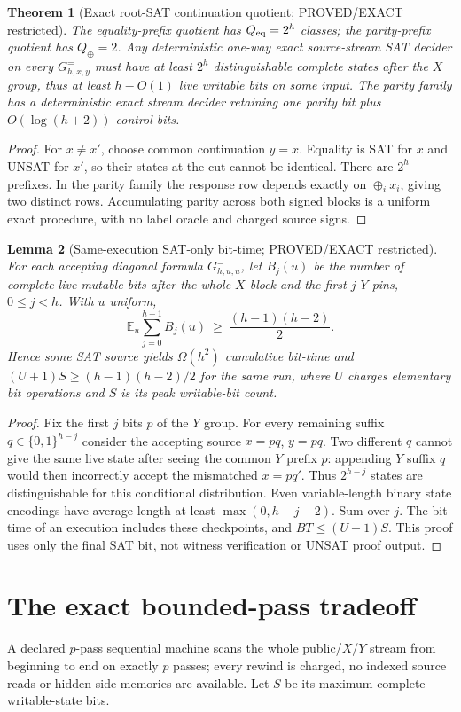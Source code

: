 \documentclass[11pt]{article}
\newtheorem{theorem}{Theorem}
\newtheorem{lemma}[theorem]{Lemma}
\begin{document}
\begin{theorem}[Exact root-SAT continuation quotient; PROVED/EXACT restricted]
The equality-prefix quotient has $Q_{\rm eq}=2^h$ classes; the parity-prefix quotient has $Q_\oplus=2$. Any deterministic one-way exact source-stream SAT decider on every $G^=_{h,x,y}$ must have at least $2^h$ distinguishable complete states after the $X$ group, thus at least $h-O(1)$ live writable bits on some input. The parity family has a deterministic exact stream decider retaining one parity bit plus $O(\log(h+2))$ control bits.
\end{theorem}
\begin{proof}
For $x\ne x'$, choose common continuation $y=x$. Equality is SAT for $x$ and UNSAT for $x'$, so their states at the cut cannot be identical. There are $2^h$ prefixes. In the parity family the response row depends exactly on $\oplus_i x_i$, giving two distinct rows. Accumulating parity across both signed blocks is a uniform exact procedure, with no label oracle and charged source signs.
\end{proof}

\begin{lemma}[Same-execution SAT-only bit-time; PROVED/EXACT restricted]
For each accepting diagonal formula $G^=_{h,u,u}$, let $B_j(u)$ be the number of complete live mutable bits after the whole $X$ block and the first $j$ $Y$ pins, $0\le j<h$. With $u$ uniform,
\[
\mathbb E_u\sum_{j=0}^{h-1}B_j(u)\ \ge\ \frac{(h-1)(h-2)}{2}.
\tag{5}
\]
Hence some SAT source yields $\Omega(h^2)$ cumulative bit-time and $(U+1)S\ge(h-1)(h-2)/2$ for the same run, where $U$ charges elementary bit operations and $S$ is its peak writable-bit count.
\end{lemma}
\begin{proof}
Fix the first $j$ bits $p$ of the $Y$ group. For every remaining suffix $q\in\{0,1\}^{h-j}$ consider the accepting source $x=pq$, $y=pq$. Two different $q$ cannot give the same live state after seeing the common $Y$ prefix $p$: appending $Y$ suffix $q$ would then incorrectly accept the mismatched $x=pq'$. Thus $2^{h-j}$ states are distinguishable for this conditional distribution. Even variable-length binary state encodings have average length at least $\max(0,h-j-2)$. Sum over $j$. The bit-time of an execution includes these checkpoints, and $BT\le(U+1)S$. This proof uses only the final SAT bit, not witness verification or UNSAT proof output.
\end{proof}

\section{The exact bounded-pass tradeoff}
A declared $p$-pass sequential machine scans the whole public/$X$/$Y$ stream from beginning to end on exactly $p$ passes; every rewind is charged, no indexed source reads or hidden side memories are available. Let $S$ be its maximum complete writable-state bits.
\end{document}
